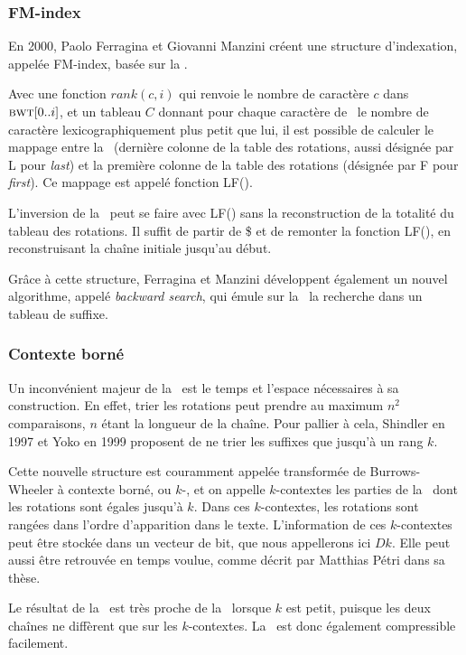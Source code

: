 \subsubsection{FM-index}

En 2000, Paolo Ferragina et Giovanni Manzini créent une structure d'indexation, appelée FM-index, basée sur la \bwt. 

Avec une fonction $rank(c, i)$ qui renvoie  le nombre de caractère $c$ dans $\textsc{bwt}[0..i]$, et un tableau $C$ donnant pour chaque caractère de \bwt\ le nombre de caractère lexicographiquement plus petit que lui, il est possible de calculer le mappage entre la \bwt\ (dernière colonne de la table des rotations, aussi désignée par L pour \textit{last}) et la première colonne de la table des rotations (désignée par F pour \textit{first}). Ce mappage est appelé fonction LF().

L'inversion de la \bwt\ peut se faire avec LF() sans la reconstruction de la totalité du tableau des rotations. 
Il suffit de partir de \$ et de remonter la fonction LF(), en reconstruisant la chaîne initiale jusqu'au début.

Grâce à cette structure, Ferragina et Manzini développent également un nouvel algorithme, appelé \textit{backward search}, qui émule sur la \bwt\ la recherche dans un tableau de suffixe.

\subsubsection{Contexte borné}
Un inconvénient majeur de la \bwt\ est le temps et l'espace nécessaires à sa construction. En effet, trier les rotations peut prendre au maximum $n^{2}$ comparaisons, $n$ étant la longueur de la chaîne.
Pour pallier à cela, Shindler en 1997 et Yoko en 1999 proposent de ne trier les suffixes que jusqu'à un rang $k$. 

Cette nouvelle structure est couramment appelée transformée de Burrows-Wheeler à contexte borné, ou $k$-\bwt, et on appelle $k$-contextes les parties de la \kbwt\ dont les rotations sont égales jusqu'à $k$. Dans ces $k$-contextes, les rotations sont rangées dans l'ordre d'apparition dans le texte. L'information de ces $k$-contextes peut être stockée dans un vecteur de bit, que nous appellerons ici $Dk$. Elle peut aussi être retrouvée en temps voulue, comme décrit par Matthias Pétri dans sa thèse.

Le résultat de la \kbwt\ est très proche de la \bwt\ lorsque $k$ est petit, puisque les deux chaînes ne diffèrent que sur les $k$-contextes. La \kbwt\ est donc également compressible facilement.

